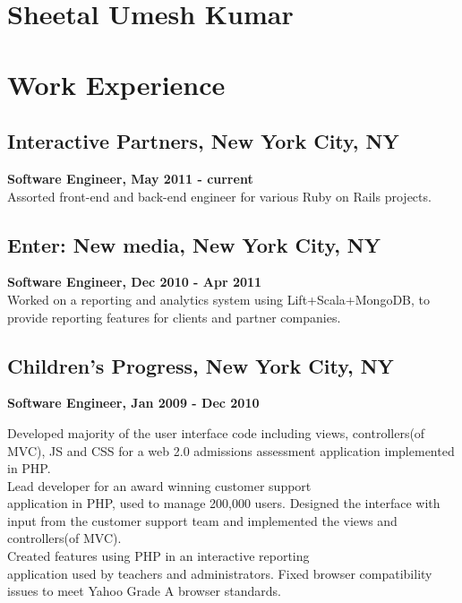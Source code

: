 \documentclass{article}
\begin{document}
\begin{minipage}[t]{3.8in} 
\vspace{-25pt}
\section *{\Huge Sheetal Umesh Kumar} 
\vspace{28pt}
 \section*{Work Experience}   
      \subsection*{Interactive Partners, New York City, NY}
      {\bf Software Engineer, May 2011 - current} \\
      Assorted front-end and back-end engineer for various Ruby on Rails projects.
      
      \subsection*{Enter: New media, New York City, NY}
      {\bf Software Engineer,  Dec 2010 - Apr 2011} \\
      Worked on a reporting and analytics system using Lift+Scala+MongoDB, to provide reporting features for clients and partner companies.
      
      \subsection*{Children's Progress, New York City, NY}
      {\bf Software Engineer, Jan 2009 - Dec 2010} 
      
      Developed majority of the user interface code including views, controllers(of MVC), JS and CSS for a web 2.0 admissions assessment application implemented in PHP. \\
      
      Lead developer for an award winning customer support \\ application in PHP, used to manage 200,000 users. Designed the interface with input from the customer support team and implemented the views and controllers(of MVC). \\
      
      Created features using PHP in an interactive reporting \\ application used by teachers and administrators. Fixed browser compatibility issues to meet Yahoo Grade A browser standards. \\
      

\end{minipage}
\end{document}
